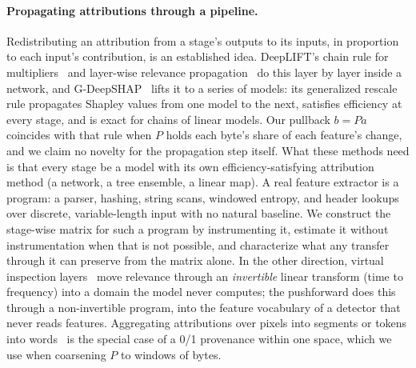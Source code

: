 \paragraph{Propagating attributions through a pipeline.} Redistributing an attribution from a stage's outputs to its inputs, in proportion to each input's contribution, is an established idea. DeepLIFT's chain rule for multipliers~\cite{shrikumar2017learning} and layer-wise relevance propagation~\cite{bach2015pixel} do this layer by layer inside a network, and G-DeepSHAP~\cite{chen2022explaining} lifts it to a series of models: its generalized rescale rule propagates Shapley values from one model to the next, satisfies efficiency at every stage, and is exact for chains of linear models. Our pullback $b = Pa$ coincides with that rule when $P$ holds each byte's share of each feature's change, and we claim no novelty for the propagation step itself. What these methods need is that every stage be a model with its own efficiency-satisfying attribution method (a network, a tree ensemble, a linear map). A real feature extractor is a program: a parser, hashing, string scans, windowed entropy, and header lookups over discrete, variable-length input with no natural baseline. We construct the stage-wise matrix for such a program by instrumenting it, estimate it without instrumentation when that is not possible, and characterize what any transfer through it can preserve from the matrix alone. In the other direction, virtual inspection layers~\cite{vielhaben2024explainable} move relevance through an \emph{invertible} linear transform (time to frequency) into a domain the model never computes; the pushforward does this through a non-invertible program, into the feature vocabulary of a detector that never reads features. Aggregating attributions over pixels into segments or tokens into words~\cite{jullum2021groupshapley} is the special case of a 0/1 provenance within one space, which we use when coarsening $P$ to windows of bytes.

